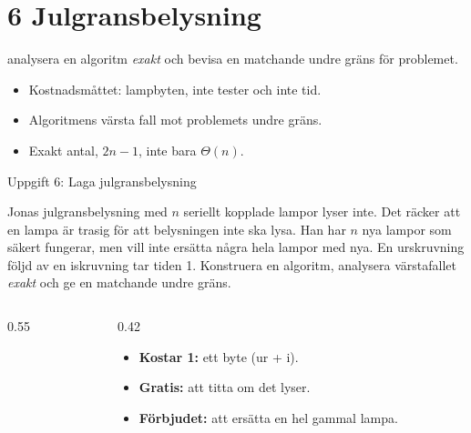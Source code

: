\section{6 Julgransbelysning}

{analysera en algoritm \emph{exakt} och bevisa en matchande undre gräns för problemet.}
{\begin{itemize}\setlength{\itemsep}{1pt}
  \item Kostnadsmåttet: lampbyten, inte tester och inte tid.
  \item Algoritmens värsta fall mot problemets undre gräns.
  \item Exakt antal, $2n-1$, inte bara $\Theta(n)$.
\end{itemize}}

\begin{frame}{Uppgift 6: Laga julgransbelysning}
\begin{infobox}[fontupper=\footnotesize]
Jonas julgransbelysning med $n$ seriellt kopplade lampor lyser inte. Det räcker att en lampa är
trasig för att belysningen inte ska lysa. Han har $n$ nya lampor som säkert fungerar, men vill
inte ersätta några hela lampor med nya. En urskruvning följd av en iskruvning tar tiden 1.
Konstruera en algoritm, analysera värstafallet \emph{exakt} och ge en matchande undre gräns.
\end{infobox}
\begin{columns}[T]
\begin{column}{0.55\textwidth}
\centering

\end{column}
\begin{column}{0.42\textwidth}
\small
\begin{itemize}\setlength{\itemsep}{2pt}
  \item \textbf{Kostar 1:} ett byte (ur + i).
  \item \textbf{Gratis:} att titta om det lyser.
  \item \textbf{Förbjudet:} att ersätta en hel gammal lampa.
\end{itemize}
\end{column}
\end{columns}
\end{frame}

